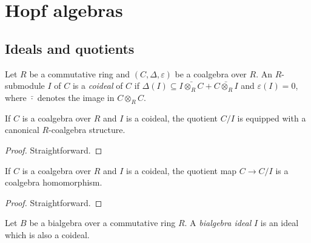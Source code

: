 \section{Hopf algebras}


\subsection{Ideals and quotients}


\begin{definition}[Coideal]
  \label{0-coideal}

  Let $R$ be a commutative ring and $(C,\Delta,\varepsilon)$ be a coalgebra over $R$.
  An $R$-submodule $I$ of $C$ is a \emph{coideal} of $C$ if
  $\Delta(I) \subseteq \bar{I \otimes_R C} + \bar{C \otimes_R I}$ and $\varepsilon(I)=0$,
  where $\bar{\cdot}$ denotes the image in $C \otimes_R C$.
\end{definition}


\begin{proposition}
  \label{0-coquot}

  If $C$ is a coalgebra over $R$ and $I$ is a coideal,
  the quotient $C /I$ is equipped with a canonical $R$-coalgebra structure.
\end{proposition}
\begin{proof}

  Straightforward.
\end{proof}


\begin{proposition}
  \label{0-coquot-hom}

  If $C$ is a coalgebra over $R$ and $I$ is a coideal,
  the quotient map $C \to C / I$ is a coalgebra homomorphism.
\end{proposition}
\begin{proof}

  Straightforward.
\end{proof}


\begin{definition}
  \label{0-biideal}

  Let $B$ be a bialgebra over a commutative ring $R$.
  A \emph{bialgebra ideal} $I$ is an ideal which is also a coideal.
\end{definition}


